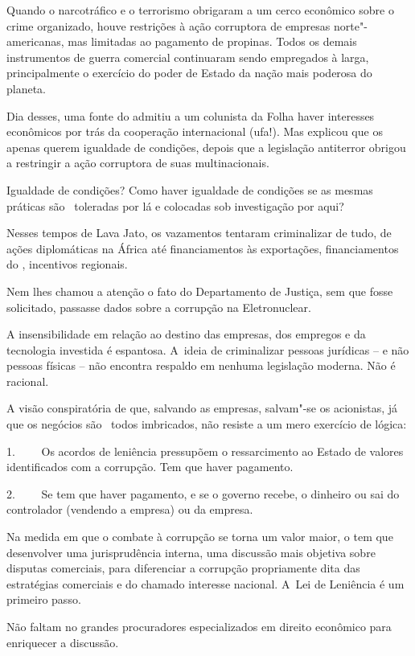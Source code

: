 Quando o narcotráfico e o terrorismo obrigaram a um cerco econômico
sobre o crime organizado, houve restrições à ação corruptora de empresas
norte"-americanas, mas limitadas ao pagamento de propinas. Todos os
demais instrumentos de guerra comercial continuaram sendo empregados à
larga, principalmente o exercício do poder de Estado da nação mais
poderosa do planeta.

Dia desses, uma fonte do  admitiu a um colunista da Folha haver
interesses econômicos por trás da cooperação internacional (ufa!). Mas
explicou que os  apenas querem igualdade de condições, depois que a
legislação antiterror obrigou a restringir a ação corruptora de suas
multinacionais.

Igualdade de condições? Como haver igualdade de condições se as mesmas
práticas são ~toleradas por lá e colocadas sob investigação por aqui?

Nesses tempos de Lava Jato, os vazamentos tentaram criminalizar de tudo,
de ações diplomáticas na África até financiamentos às exportações,
financiamentos do , incentivos regionais.

Nem lhes chamou a atenção o fato do Departamento de Justiça, sem que
fosse solicitado, passasse dados sobre a corrupção na Eletronuclear.

A insensibilidade em relação ao destino das empresas, dos empregos e da
tecnologia investida é espantosa. A~ideia de criminalizar pessoas
jurídicas -- e não pessoas físicas -- não encontra respaldo em nenhuma
legislação moderna. Não é racional.

A visão conspiratória de que, salvando as empresas, salvam"-se os
acionistas, já que os negócios são ~todos imbricados, não resiste a um
mero exercício de lógica:

1.~~~~ Os acordos de leniência pressupõem o ressarcimento ao Estado de
valores identificados com a corrupção. Tem que haver pagamento.

2.~~~~ Se tem que haver pagamento, e se o governo recebe, o dinheiro ou
sai do controlador (vendendo a empresa) ou da empresa.

Na medida em que o combate à corrupção se torna um valor maior, o 
tem que desenvolver uma jurisprudência interna, uma discussão mais
objetiva sobre disputas comerciais, para diferenciar a corrupção
propriamente dita das estratégias comerciais e do chamado interesse
nacional. A~Lei de Leniência é um primeiro passo.

Não faltam no  grandes procuradores especializados em direito
econômico para enriquecer a discussão.
